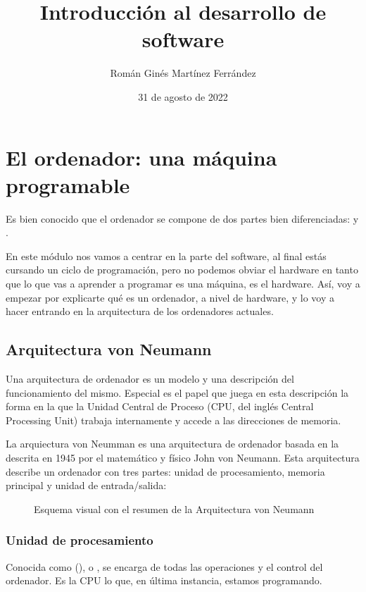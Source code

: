 \documentclass[letterpaper,10pt,spanish]{sphinxmanual}
\title{Introducción al desarrollo de software}
\date{31 de agosto de 2022}
\author{Román Ginés Martínez Ferrández}
\begin{document}
\pagestyle{empty}
\sphinxmaketitle
\pagestyle{plain}
\sphinxtableofcontents
\pagestyle{normal}
\label{\detokenize{index::doc}}


\sphinxstepscope


\chapter{El ordenador: una máquina programable}
\label{\detokenize{software_hardware:el-ordenador-una-maquina-programable}}\label{\detokenize{software_hardware::doc}}
\sphinxAtStartPar
Es bien conocido que el ordenador se compone de dos partes bien diferenciadas:  y .

\sphinxAtStartPar
En este módulo nos vamos a centrar en la parte del software, al final estás cursando un ciclo de programación, pero no podemos obviar el hardware en tanto que lo que vas a aprender a programar es una máquina, es el hardware. Así, voy a empezar por explicarte qué es un ordenador, a nivel de hardware, y lo voy a hacer entrando en la arquitectura de los ordenadores actuales.


\section{Arquitectura von Neumann}
\label{\detokenize{software_hardware:arquitectura-von-neumann}}
\sphinxAtStartPar
Una arquitectura de ordenador es un modelo y una descripción del funcionamiento del mismo. Especial es el papel que juega en esta descripción la forma en la que la Unidad Central de Proceso (CPU, del inglés Central Processing Unit) trabaja internamente y accede a las direcciones de memoria.

\sphinxAtStartPar
La arquiectura von Neumman es una arquitectura de ordenador basada en la descrita en 1945 por el matemático y físico John von Neumann. Esta arquitectura describe un ordenador con tres partes: unidad de procesamiento, memoria principal y unidad de entrada/salida:

\begin{figure}[htbp]
\centering
\capstart

\noindent{}
\caption{Esquema visual con el resumen de la Arquitectura von Neumann}\label{\detokenize{software_hardware:id1}}\end{figure}


\subsection{Unidad de procesamiento}
\label{\detokenize{software_hardware:unidad-de-procesamiento}}
\sphinxAtStartPar
Conocida como  (),  o , se encarga de todas las operaciones y el control del ordenador. Es la CPU lo que, en última instancia, estamos programando.
\end{document}
